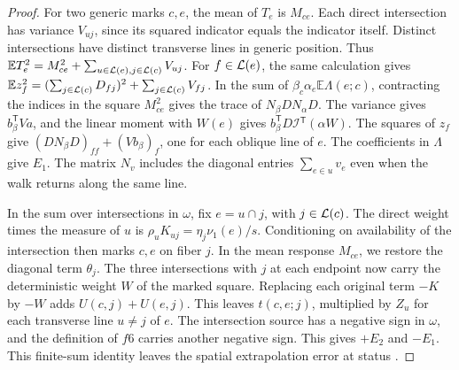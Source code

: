 \begin{proof}
For two generic marks \(c,e\), the mean of \(T_e\) is \(M_{ce}\). Each direct intersection has variance
\(V_{uj}\), since its squared indicator equals the indicator itself. Distinct intersections have distinct
transverse lines in generic position. Thus \(\mathbb E T_e^2=M_{ce}^2+\sum_{u\in \mathcal L(e),j\in
\mathcal L(c)}V_{uj}\). For \(f\in \mathcal L(e)\), the same calculation gives \(\mathbb E
z_f^2=(\sum_{j\in \mathcal L(c)}D_{fj})^2+\sum_{j\in \mathcal L(c)}V_{fj}\). In the sum of
\(\beta_c\alpha_e\mathbb E\Lambda(e;c)\), contracting the indices in the square \(M_{ce}^2\) gives the
trace of \(N_\beta D N_\alpha D\). The variance gives \(b_\beta^{\mathsf T}Va\), and the linear moment
with \(W(e)\) gives \(b_\beta^{\mathsf T}D\mathcal I{}^{\mathsf T}(\alpha W)\). The squares of \(z_f\)
give \((DN_\beta D)_{ff}+(Vb_\beta)_f\), one for each oblique line of \(e\). The coefficients in
\(\Lambda\) give \(E_1\). The matrix \(N_v\) includes the diagonal entries \(\sum_{e\in u}v_e\) even when
the walk returns along the same line.

In the sum over intersections in \(\omega\), fix \(e=u\cap j\), with \(j\in \mathcal L(c)\). The direct
weight times the measure of \(u\) is \(\rho_uK_{uj}=\eta_j\nu_1(e)/s\). Conditioning on availability of
the intersection then marks \(c,e\) on fiber \(j\). In the mean response \(M_{ce}\), we restore the
diagonal term \(\theta_j\). The three intersections with \(j\) at each endpoint now carry the
deterministic weight \(W\) of the marked square. Replacing each original term \(-K\) by \(-W\) adds
\(U(c,j)+U(e,j)\). This leaves \(t(c,e;j)\), multiplied by \(Z_u\) for each transverse line \(u\ne j\) of
\(e\). The intersection source has a negative sign in \(\omega\), and the definition of \(f6\) carries
another negative sign. This gives \(+E_2\) and \(-E_1\). This finite-sum identity leaves the spatial
extrapolation error at status . \end{proof}

